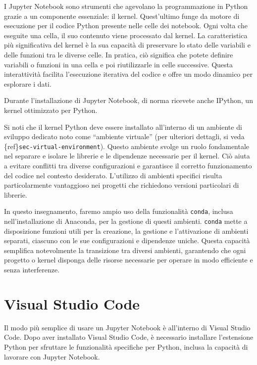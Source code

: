 \documentclass[
  letterpaper,
  krantz2]{{[}./krantz{]}}
\begin{document}
I Jupyter Notebook sono strumenti che agevolano la programmazione in
Python grazie a un componente essenziale: il kernel. Quest'ultimo funge
da motore di esecuzione per il codice Python presente nelle celle dei
notebook. Ogni volta che eseguite una cella, il suo contenuto viene
processato dal kernel. La caratteristica più significativa del kernel è
la sua capacità di preservare lo stato delle variabili e delle funzioni
tra le diverse celle. In pratica, ciò significa che potete definire
variabili o funzioni in una cella e poi riutilizzarle in celle
successive. Questa interattività facilita l'esecuzione iterativa del
codice e offre un modo dinamico per esplorare i dati.

Durante l'installazione di Jupyter Notebook, di norma ricevete anche
IPython, un kernel ottimizzato per Python.

Si noti che il kernel Python deve essere installato all'interno di un
ambiente di sviluppo dedicato noto come ``ambiente virtuale'' (per
ulteriori dettagli, si veda \{ref\}\texttt{sec-virtual-environment}).
Questo ambiente svolge un ruolo fondamentale nel separare e isolare le
librerie e le dipendenze necessarie per il kernel. Ciò aiuta a evitare
conflitti tra diverse configurazioni e garantisce il corretto
funzionamento del codice nel contesto desiderato. L'utilizzo di ambienti
specifici risulta particolarmente vantaggioso nei progetti che
richiedono versioni particolari di librerie.

In questo insegnamento, faremo ampio uso della funzionalità
\texttt{conda}, inclusa nell'installazione di Anaconda, per la gestione
di questi ambienti. \texttt{conda} mette a disposizione funzioni utili
per la creazione, la gestione e l'attivazione di ambienti separati,
ciascuno con le sue configurazioni e dipendenze uniche. Questa capacità
semplifica notevolmente la transizione tra diversi ambienti, garantendo
che ogni progetto o kernel disponga delle risorse necessarie per operare
in modo efficiente e senza interferenze.

\section{Visual Studio Code}\label{visual-studio-code}

Il modo più semplice di usare un Jupyter Notebook è all'interno di
Visual Studio Code. Dopo aver installato Visual Studio Code, è
necessario installare l'estensione Python per sfruttare le funzionalità
specifiche per Python, inclusa la capacità di lavorare con Jupyter
Notebook.
\end{document}
